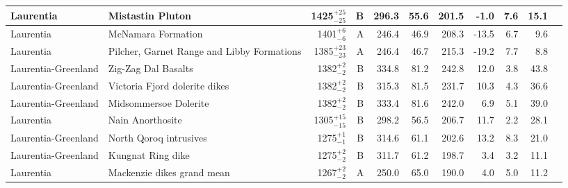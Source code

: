 \documentclass[twocolumn, switch]{article} %
\begin{document}
{\begin{landscape}
\begin{ThreePartTable}
\begin{longtable}{p{1.4 in}p{1.2 in}rrrrrrrrp{1.2 in}}
                     Laurentia &                                   Mistastin Pluton &   1425$^{+25}_{-25}$ &      B &     296.3 &      55.6 & 201.5 &  -1.0 &       7.6 &        15.1 &                                 \cite{Fahrig1976a} \\ \hline
                     Laurentia &                                 McNamara Formation &     1401$^{+6}_{-6}$ &      A &     246.4 &      46.9 & 208.3 & -13.5 &       6.7 &         9.6 &                                 \cite{Elston2002a} \\ \hline
                     Laurentia &         Pilcher, Garnet Range and Libby Formations &   1385$^{+23}_{-23}$ &      A &     246.4 &      46.7 & 215.3 & -19.2 &       7.7 &         8.8 &                                 \cite{Elston2002a} \\ \hline
           Laurentia-Greenland &                                Zig-Zag Dal Basalts &     1382$^{+2}_{-2}$ &      B &     334.8 &      81.2 & 242.8 &  12.0 &       3.8 &        43.8 &                              \cite{Marcussen1983a} \\ \hline
           Laurentia-Greenland &                      Victoria Fjord dolerite dikes &     1382$^{+2}_{-2}$ &      B &     315.3 &      81.5 & 231.7 &  10.3 &       4.3 &        36.6 &                             \cite{Abrahamsen1987a} \\ \hline
           Laurentia-Greenland &                              Midsommersoe Dolerite &     1382$^{+2}_{-2}$ &      B &     333.4 &      81.6 & 242.0 &   6.9 &       5.1 &        39.0 &                              \cite{Marcussen1983a} \\ \hline
                     Laurentia &                                   Nain Anorthosite &   1305$^{+15}_{-15}$ &      B &     298.2 &      56.5 & 206.7 &  11.7 &       2.2 &        28.1 &                                 \cite{Murthy1978a} \\ \hline
           Laurentia-Greenland &                             North Qoroq intrusives &     1275$^{+1}_{-1}$ &      B &     314.6 &      61.1 & 202.6 &  13.2 &       8.3 &        21.0 &                                  \cite{Piper1992a} \\ \hline
           Laurentia-Greenland &                                  Kungnat Ring dike &     1275$^{+2}_{-2}$ &      B &     311.7 &      61.2 & 198.7 &   3.4 &       3.2 &        11.1 &                                  \cite{Piper1977b} \\ \hline
                     Laurentia &                         Mackenzie dikes grand mean &     1267$^{+2}_{-2}$ &      A &     250.0 &      65.0 & 190.0 &   4.0 &       5.0 &        11.2 &                                 \cite{Buchan2000a} \\ \hline

\end{longtable}
\end{ThreePartTable}
\end{landscape}}
\end{document}
